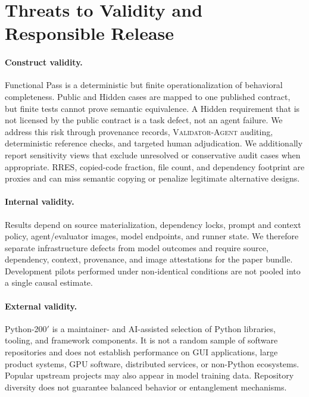 \documentclass[acmsmall,screen,review,anonymous]{acmart}
\newcommand{\rres}{\textsc{RRES}\xspace}
\newcommand{\validatoragent}{\textsc{Validator-Agent}\xspace}
\begin{document}
\section{Threats to Validity and Responsible Release}
\label{sec:threats}

\paragraph{Construct validity.}
Functional Pass is a deterministic but finite operationalization of behavioral
completeness. Public and Hidden cases are mapped to one published contract, but
finite tests cannot prove semantic equivalence. A Hidden requirement that is not
licensed by the public contract is a task defect, not an agent failure. We address
this risk through provenance records, \validatoragent auditing, deterministic
reference checks, and targeted human adjudication. We additionally report
sensitivity views that exclude unresolved or conservative audit cases when
appropriate. \rres, copied-code fraction, file count, and dependency footprint are
proxies and can miss semantic copying or penalize legitimate alternative designs.

\paragraph{Internal validity.}
Results depend on source materialization, dependency locks, prompt and context
policy, agent/evaluator images, model endpoints, and runner state. We therefore
separate infrastructure defects from model outcomes and require source,
dependency, context, provenance, and image attestations for the paper bundle.
Development pilots performed under non-identical conditions are not pooled into a
single causal estimate.

\paragraph{External validity.}
Python-200$'$ is a maintainer- and AI-assisted selection of Python libraries,
tooling, and framework components. It is not a random sample of software
repositories and does not establish performance on GUI applications, large product
systems, GPU software, distributed services, or non-Python ecosystems. Popular
upstream projects may also appear in model training data. Repository diversity
does not guarantee balanced behavior or entanglement mechanisms.
\end{document}

